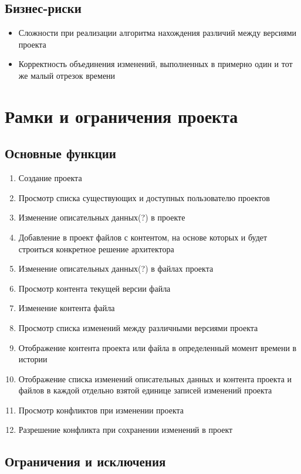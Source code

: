 \documentclass[a4paper,14pt]{extreport} %
\begin{document}
\subsection{Бизнес-риски}
 
\begin{itemize}
\item Сложности при реализации алгоритма нахождения различий между версиями проекта
\item Корректность объединения изменений, выполненных  в примерно один и тот же малый отрезок времени
\end {itemize}

\newpage

\section{Рамки и ограничения проекта}
\subsection{Основные функции}

\begin{enumerate}
\item Создание проекта
\item Просмотр списка существующих и доступных пользователю проектов
\item Изменение описательных данных(?) в проекте
\item Добавление в проект файлов с контентом, на основе которых и будет строиться конкретное решение архитектора
\item Изменение описательных данных(?) в файлах проекта
\item Просмотр контента текущей версии файла
\item Изменение контента файла
\item Просмотр списка изменений между различными версиями проекта
\item Отображение контента проекта или файла в определенный момент времени в истории
\item Отображение списка изменений описательных данных и контента проекта и файлов в каждой отдельно взятой единице записей изменений проекта
\item Просмотр конфликтов при изменении проекта
\item Разрешение конфликта при сохранении изменений в проект
\end {enumerate}

\subsection{Ограничения и исключения}
\end{document}
